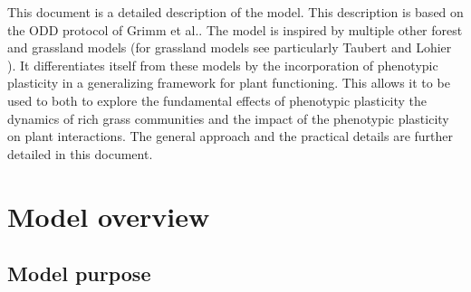 

\begin{fullwidth}
\noindent
This document is a detailed description of the \model model. This description is based on the ODD protocol of Grimm et al.. The model is inspired by multiple other forest and grassland models (for grassland models see particularly Taubert \cite{taubert_modelling_2014} and Lohier \cite{lohier_explaining_2014}). It differentiates itself from these models by the incorporation of phenotypic plasticity in a generalizing framework for plant functioning. This allows it to be used to both to explore the fundamental effects of phenotypic plasticity the dynamics of rich grass communities and the impact of the phenotypic plasticity on plant interactions. The general approach and the practical details are further detailed in this document.
\end{fullwidth}



\section{Model overview}

\subsection{Model purpose}

